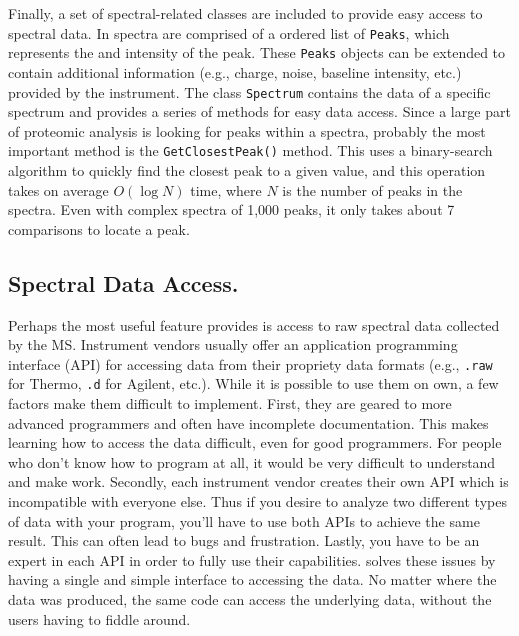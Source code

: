 Finally, a set of spectral-related classes are included to provide easy access to spectral data. In \csmsl{} spectra are comprised of a ordered list of \texttt{Peaks}, which represents the \mz{} and intensity of the peak. These \texttt{Peaks} objects can be extended to contain additional information (e.g., charge, noise, baseline intensity, etc.) provided by the instrument. The class \texttt{Spectrum} contains the data of a specific spectrum and provides a series of methods for easy data access. Since a large part of proteomic analysis is looking for peaks within a spectra, probably the most important method is the \texttt{GetClosestPeak()} method. This uses a binary-search algorithm to quickly find the closest peak to a given \mz{} value, and this operation takes on average $O(\log N)$ time, where $N$ is the number of peaks in the spectra. Even with complex spectra of 1,000 peaks, it only takes about 7 comparisons to locate a peak.

\subsection*{Spectral Data Access.}
Perhaps the most useful feature \csmsl{} provides is access to raw spectral data collected by the MS. Instrument vendors usually offer an application programming interface (API) for accessing data from their propriety data formats (e.g., \texttt{.raw} for Thermo, \texttt{.d} for Agilent, etc.). While it is possible to use them on own, a few factors make them difficult to implement. First, they are geared to more advanced programmers and often have incomplete documentation. This makes learning how to access the data difficult, even for good programmers. For people who don't know how to program at all, it would be very difficult to understand and make work. Secondly, each instrument vendor creates their own API which is incompatible with everyone else. Thus if you desire to analyze two different types of data with your program, you'll have to use both APIs to achieve the same result. This can often lead to bugs and frustration. Lastly, you have to be an expert in each API in order to fully use their capabilities. \csmsl{} solves these issues by having a single and simple interface to accessing the data. No matter where the data was produced, the same code can access the underlying data, without the users having to fiddle around. 

